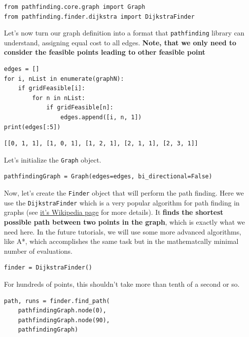 \begin{verbatim}
from pathfinding.core.graph import Graph
from pathfinding.finder.dijkstra import DijkstraFinder
\end{verbatim}

Let's now turn our graph definition into a format that
\texttt{pathfinding} library can understand, assigning
equal cost to all edges. \textbf{Note, that we only need to consider the
feasible points leading to other feasible point}

\begin{verbatim}
edges = []
for i, nList in enumerate(graphN):
    if gridFeasible[i]:
        for n in nList:
            if gridFeasible[n]:
                edges.append([i, n, 1])
print(edges[:5])
\end{verbatim}

\begin{verbatim}
[[0, 1, 1], [1, 0, 1], [1, 2, 1], [2, 1, 1], [2, 3, 1]]
\end{verbatim}

Let's initialize the \texttt{Graph} object.

\begin{verbatim}
pathfindingGraph = Graph(edges=edges, bi_directional=False)
\end{verbatim}

Now, let's create the \texttt{Finder} object that will
perform the path finding. Here we use the
\texttt{DijkstraFinder} which is a very popular
algorithm for path finding in graphs (see
\href{https://en.wikipedia.org/wiki/Dijkstra's_algorithm}{it's Wikipedia
page} for more details). It \textbf{finds the shortest possible path
between two points in the graph}, which is exactly what we need here. In
the future tutorials, we will use some more advanced algorithms, like
A*, which accomplishes the same task but in the mathematcally minimal
number of evaluations.

\begin{verbatim}
finder = DijkstraFinder()
\end{verbatim}

For hundreds of points, this shouldn't take more than tenth of a second
or so.

\begin{verbatim}
path, runs = finder.find_path(
    pathfindingGraph.node(0), 
    pathfindingGraph.node(90), 
    pathfindingGraph)
\end{verbatim}

